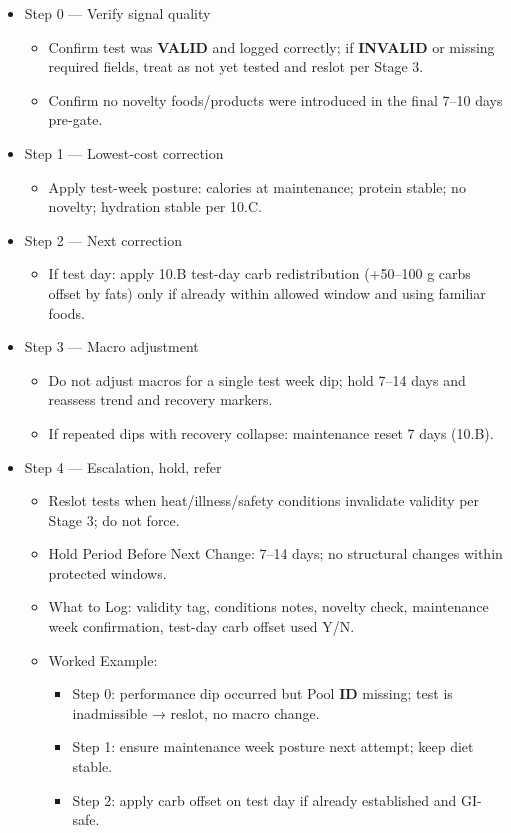 \documentclass[10pt]{article}
\begin{document}
\begin{itemize}
\item Step 0 — Verify signal quality
  \begin{itemize}
  \item Confirm test was \textbf{VALID} and logged correctly; if \textbf{INVALID} or missing required fields, treat as not yet tested and reslot per Stage 3.
  \item Confirm no novelty foods/products were introduced in the final 7–10 days pre-gate.
  \end{itemize}
\item Step 1 — Lowest-cost correction
  \begin{itemize}
  \item Apply test-week posture: calories at maintenance; protein stable; no novelty; hydration stable per 10.C.
  \end{itemize}
\item Step 2 — Next correction
  \begin{itemize}
  \item If test day: apply 10.B test-day carb redistribution (+50–100 g carbs offset by fats) only if already within allowed window and using familiar foods.
  \end{itemize}
\item Step 3 — Macro adjustment
  \begin{itemize}
  \item Do not adjust macros for a single test week dip; hold 7–14 days and reassess trend and recovery markers.
  \item If repeated dips with recovery collapse: maintenance reset 7 days (10.B).
  \end{itemize}
\item Step 4 — Escalation, hold, refer
  \begin{itemize}
  \item Reslot tests when heat/illness/safety conditions invalidate validity per Stage 3; do not force.
  \item Hold Period Before Next Change: 7–14 days; no structural changes within protected windows.
  \item What to Log: validity tag, conditions notes, novelty check, maintenance week confirmation, test-day carb offset used Y/N.
  \item Worked Example:
    \begin{itemize}
    \item Step 0: performance dip occurred but Pool \textbf{ID} missing; test is inadmissible → reslot, no macro change.
    \item Step 1: ensure maintenance week posture next attempt; keep diet stable.
    \item Step 2: apply carb offset on test day if already established and GI-safe.
    \end{itemize}
  \end{itemize}
\end{itemize}
\end{document}
